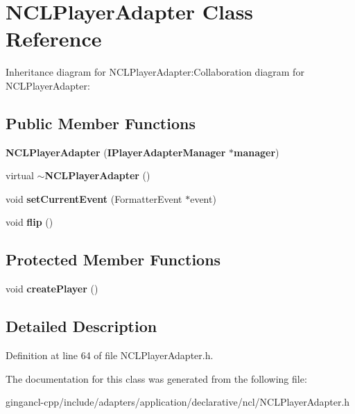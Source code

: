 \section{NCLPlayerAdapter Class Reference}
\label{classbr_1_1pucrio_1_1telemidia_1_1ginga_1_1ncl_1_1adapters_1_1application_1_1ncl_1_1NCLPlayerAdapter}
Inheritance diagram for NCLPlayerAdapter:Collaboration diagram for NCLPlayerAdapter:\subsection*{Public Member Functions}
\begin{CompactItemize}
\item 
\textbf{NCLPlayerAdapter} ({\bf IPlayerAdapterManager} $\ast${\bf manager})\label{classbr_1_1pucrio_1_1telemidia_1_1ginga_1_1ncl_1_1adapters_1_1application_1_1ncl_1_1NCLPlayerAdapter_4dbabc65beb9b4f4d8d5951f2f78f53f}

\item 
virtual {\bf $\sim$NCLPlayerAdapter} ()\label{classbr_1_1pucrio_1_1telemidia_1_1ginga_1_1ncl_1_1adapters_1_1application_1_1ncl_1_1NCLPlayerAdapter_db86624803e616af943bd62b507be863}

\item 
void \textbf{setCurrentEvent} (FormatterEvent $\ast$event)\label{classbr_1_1pucrio_1_1telemidia_1_1ginga_1_1ncl_1_1adapters_1_1application_1_1ncl_1_1NCLPlayerAdapter_de4aa1c8ab712eb3eef786af68214470}

\item 
void \textbf{flip} ()\label{classbr_1_1pucrio_1_1telemidia_1_1ginga_1_1ncl_1_1adapters_1_1application_1_1ncl_1_1NCLPlayerAdapter_126cb0362ae2e7935520fb27343bad31}

\end{CompactItemize}
\subsection*{Protected Member Functions}
\begin{CompactItemize}
\item 
void \textbf{createPlayer} ()\label{classbr_1_1pucrio_1_1telemidia_1_1ginga_1_1ncl_1_1adapters_1_1application_1_1ncl_1_1NCLPlayerAdapter_2fbb9533e3d66799b0a433c9298ea70f}

\end{CompactItemize}


\subsection{Detailed Description}




Definition at line 64 of file NCLPlayerAdapter.h.

The documentation for this class was generated from the following file:\begin{CompactItemize}
\item 
gingancl-cpp/include/adapters/application/declarative/ncl/NCLPlayerAdapter.h\end{CompactItemize}
